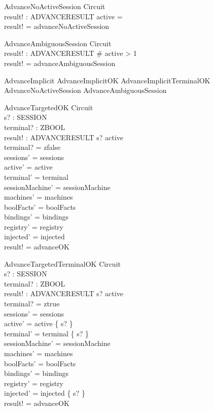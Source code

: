 \documentclass[a4paper,10pt,fleqn]{article}
\begin{document}
\begin{schema}{AdvanceNoActiveSession}
  \Xi Circuit \\
  result! : ADVANCERESULT
\where
  active = \emptyset \\
  result! = advanceNoActiveSession
\end{schema}

\begin{schema}{AdvanceAmbiguousSession}
  \Xi Circuit \\
  result! : ADVANCERESULT
\where
  \# active > 1 \\
  result! = advanceAmbiguousSession
\end{schema}

\begin{zed}
  AdvanceImplicit  AdvanceImplicitOK \lor AdvanceImplicitTerminalOK
    \lor AdvanceNoActiveSession \lor AdvanceAmbiguousSession
\end{zed}

\begin{schema}{AdvanceTargetedOK}
  \Delta Circuit \\
  s? : SESSION \\
  terminal? : ZBOOL \\
  result! : ADVANCERESULT
\where
  s? \in active \\
  terminal? = zfalse \\
  sessions' = sessions \\
  active' = active \\
  terminal' = terminal \\
  sessionMachine' = sessionMachine \\
  machines' = machines \\
  boolFacts' = boolFacts \\
  bindings' = bindings \\
  registry' = registry \\
  injected' = injected \\
  result! = advanceOK
\end{schema}

\begin{schema}{AdvanceTargetedTerminalOK}
  \Delta Circuit \\
  s? : SESSION \\
  terminal? : ZBOOL \\
  result! : ADVANCERESULT
\where
  s? \in active \\
  terminal? = ztrue \\
  sessions' = sessions \\
  active' = active \setminus \{ s? \} \\
  terminal' = terminal \cup \{ s? \} \\
  sessionMachine' = sessionMachine \\
  machines' = machines \\
  boolFacts' = boolFacts \\
  bindings' = bindings \\
  registry' = registry \\
  injected' = injected \setminus \{ s? \} \\
  result! = advanceOK
\end{schema}
\end{document}
